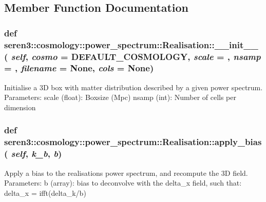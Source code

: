 \subsection{Member Function Documentation}
\hypertarget{classseren3_1_1cosmology_1_1power__spectrum_1_1Realisation_a66657479f264e864519470d5cca27da3}{
\subsubsection[{\_\-\_\-init\_\-\_\-}]{\setlength{\rightskip}{0pt plus 5cm}def seren3::cosmology::power\_\-spectrum::Realisation::\_\-\_\-init\_\-\_\- ( {\em self}, \/   {\em cosmo} = {\ttfamily DEFAULT\_\-COSMOLOGY}, \/   {\em scale} = {}, \/   {\em nsamp} = {}, \/   {\em filename} = {\ttfamily None}, \/   {\em cols} = {\ttfamily None})}}
\label{classseren3_1_1cosmology_1_1power__spectrum_1_1Realisation_a66657479f264e864519470d5cca27da3}
\begin{DoxyVerb}Initialise a 3D box with matter distribution described by a given power spectrum.
Parameters:
    scale (float): Boxsize (Mpc)
    nsamp (int): Number of cells per dimension
\end{DoxyVerb}
 \hypertarget{classseren3_1_1cosmology_1_1power__spectrum_1_1Realisation_a9ba2161fc48fe4a8588f84e62e668dc0}{
\subsubsection[{apply\_\-bias}]{\setlength{\rightskip}{0pt plus 5cm}def seren3::cosmology::power\_\-spectrum::Realisation::apply\_\-bias ( {\em self}, \/   {\em k\_\-b}, \/   {\em b})}}
\label{classseren3_1_1cosmology_1_1power__spectrum_1_1Realisation_a9ba2161fc48fe4a8588f84e62e668dc0}
\begin{DoxyVerb}Apply a bias to the realisations power spectrum, and recompute the 3D field.
Parameters:
    b (array): bias to deconvolve with the delta_x field, such that:
    delta_x = ifft(delta_k/b)
\end{DoxyVerb}

